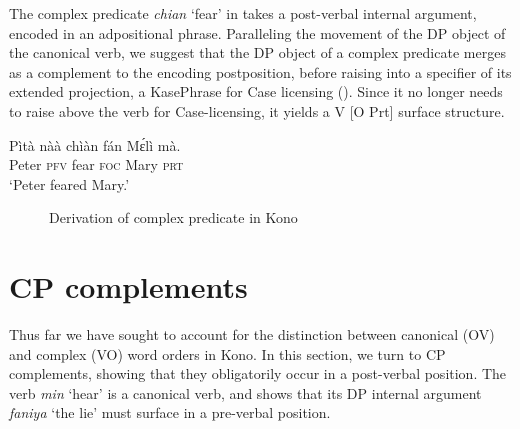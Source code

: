 \documentclass[output=paper,colorlinks,citecolor=brown,draftmode
]{langscibook}
\begin{document}
The complex predicate \textit{chian} ‘fear’ in  takes a post-verbal internal argument, encoded in an adpositional phrase. Paralleling the movement of the DP object of the canonical verb, we suggest that the DP object of a complex predicate merges as a complement to the encoding postposition, before raising into a specifier of its extended projection, a KasePhrase for Case licensing (). Since it no longer needs to raise above the verb for Case-licensing, it yields a V [O Prt] surface structure. 

\ea \label{ex:Kono:V O PRT}
\gll Pìtà nàà chìàn fán Mɛ́lì mà.  \\
Peter \textsc{pfv} fear \textsc{foc} Mary \textsc{prt}\\
\glt `Peter feared Mary.'
\z

 \begin{figure}
 \caption{Derivation of complex predicate in Kono}
       \label{fig:Derivation of Complex Predicate in Kono} 
 \end{figure}



\section{CP complements}
\label{sec:CP Complements}
Thus far we have sought to account for the distinction between canonical (OV) and complex (VO) word orders in Kono. In this section, we turn to CP complements, showing that they obligatorily occur in a post-verbal position. The verb \textit{min} ‘hear’ is a canonical verb, and  shows that its DP internal argument \textit{faniya} ‘the lie’ must surface in a pre-verbal position. 
\end{document}
